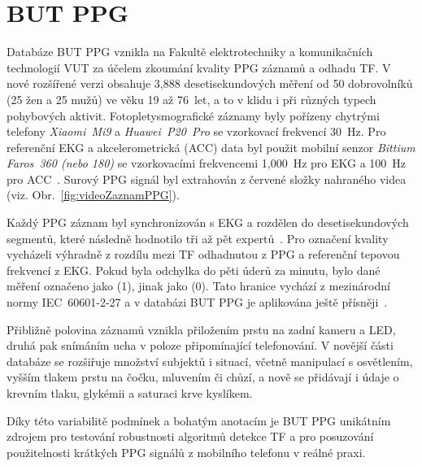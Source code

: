 \section{\acs{BUT PPG}}
\label{sec:but_ppg}
Databáze \acs{BUT PPG} vznikla na Fakultě elektrotechniky a komunikačních technologií \acs{VUT} za účelem zkoumání kvality \acs{PPG} záznamů a odhadu \acs{TF}.
V nové rozšířené verzi obsahuje 3,888 desetisekundových měření od 50 dobrovolníků (25 žen a 25 mužů) ve věku 19 až 76~let, a to v klidu i při různých typech pohybových aktivit.
Fotopletysmografické záznamy byly pořízeny chytrými telefony \textit{Xiaomi~Mi9} a \textit{Huawei~P20~Pro} se vzorkovací frekvencí 30~Hz.
Pro referenční \acs{EKG} a akcelerometrická (\acs{ACC}) data byl použit mobilní senzor \textit{Bittium Faros~360 (nebo 180)} se vzorkovacími frekvencemi 1,000~Hz pro \acs{EKG} a 100~Hz pro \acs{ACC}~\cite{BUT_PPG,BUT_PPG_database}.
Surový \acs{PPG} signál byl extrahován z červené složky nahraného videa (viz. Obr.~\ref{fig:videoZaznamPPG}).

Každý \acs{PPG} záznam byl synchronizován s \acs{EKG} a rozdělen do desetisekundových segmentů, které následně hodnotilo tři až pět expertů~\cite{BUT_PPG_database}.
Pro označení kvality vycházeli výhradně z rozdílu mezi \acs{TF} odhadnutou z \acs{PPG} a referenční tepovou frekvencí z \acs{EKG}.
Pokud byla odchylka do pěti úderů za minutu, bylo dané měření označeno jako  (1), jinak jako  (0).
Tato hranice vychází z mezinárodní normy IEC~60601-2-27 a v databázi \acs{BUT PPG} je aplikována ještě přísněji~\cite{BUT_PPG}.

Přibližně polovina záznamů vznikla přiložením prstu na zadní kameru a \acs{LED}, druhá pak snímáním ucha v poloze připomínající telefonování.
V novější části databáze se rozšiřuje množství subjektů i situací, včetně manipulací s osvětlením, vyšším tlakem prstu na čočku, mluvením či chůzí, a nově se přidávají i údaje o krevním tlaku, glykémii a saturaci krve kyslíkem.

Díky této variabilitě podmínek a bohatým anotacím je \acs{BUT PPG} unikátním zdrojem pro testování robustnosti algoritmů detekce \acs{TF} a pro posuzování použitelnosti krátkých \acs{PPG} signálů z mobilního telefonu v reálné praxi.

